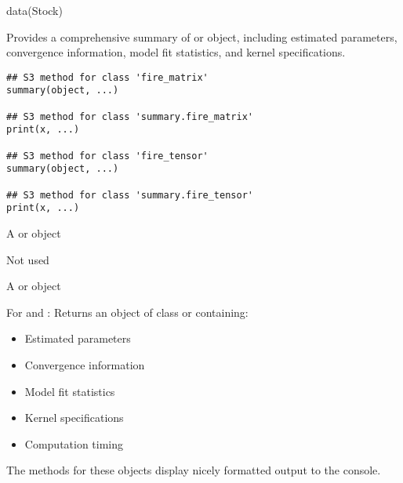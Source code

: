 \documentclass[a4paper]{book}
\begin{document}
%
\begin{Examples}
\begin{ExampleCode}
data(Stock)
\end{ExampleCode}
\end{Examples}
%
\begin{Description}
Provides a comprehensive summary of  or  object, including estimated parameters,
convergence information, model fit statistics, and kernel specifications.
\end{Description}
%
\begin{Usage}
\begin{verbatim}
## S3 method for class 'fire_matrix'
summary(object, ...)

## S3 method for class 'summary.fire_matrix'
print(x, ...)

## S3 method for class 'fire_tensor'
summary(object, ...)

## S3 method for class 'summary.fire_tensor'
print(x, ...)
\end{verbatim}
\end{Usage}
%
\begin{Arguments}
\begin{ldescription}
\item[\code{object}] A  or  object

\item[\code{...}] Not used

\item[\code{x}] A  or  object
\end{ldescription}
\end{Arguments}
%
\begin{Value}
For  and :
Returns an object of class  or 
containing:
\begin{itemize}

\item{} Estimated parameters
\item{} Convergence information
\item{} Model fit statistics
\item{} Kernel specifications
\item{} Computation timing

\end{itemize}


The  methods for these objects display nicely formatted output to the console.
\end{Value}
\end{document}

